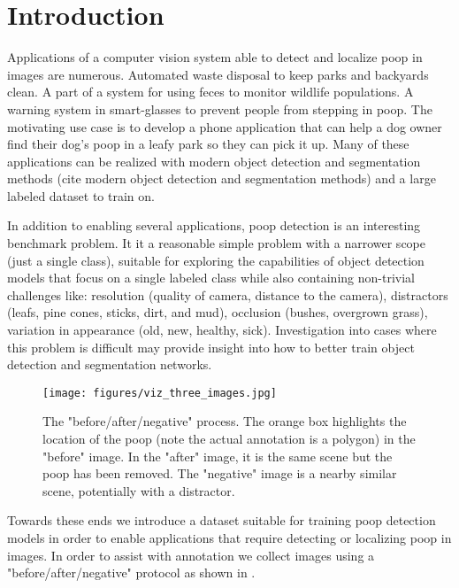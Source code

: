 \documentclass[10pt,twocolumn,letterpaper]{article}
\begin{document}
\section{Introduction}
\label{sec:intro}

Applications of a computer vision system able to detect and localize poop in
images are numerous.
Automated waste disposal to keep parks and backyards clean.
A part of a system for using feces to monitor wildlife populations.
A warning system in smart-glasses to prevent people from stepping in poop.
The motivating use case is to develop a phone application that can help a dog
owner find their dog's poop in a leafy park so they can pick it up.
Many of these applications can be realized with modern object detection and
segmentation methods (cite modern object detection and segmentation methods)
and a large labeled dataset to train on.


In addition to enabling several applications, poop detection is an interesting benchmark problem. 
It it a reasonable simple problem with a narrower scope (just a single class),
suitable for exploring the capabilities of object detection models that focus
on a single labeled class while also containing non-trivial challenges like:
resolution (quality of camera, distance to the camera),
distractors (leafs, pine cones, sticks, dirt, and mud),
occlusion (bushes, overgrown grass),
variation in appearance (old, new, healthy, sick).
Investigation into cases where this problem is difficult may provide insight
into how to better train object detection and segmentation networks.


\begin{figure}[ht]
\centering
\texttt{[image: figures/viz\_three\_images.jpg]}
\caption[]{
    The "before/after/negative" process.
    The orange box highlights the location of the poop (note the
    actual annotation is a polygon) in the "before" image.
    In the "after" image, it is the same scene but the poop has been removed.
    The "negative" image is a nearby similar scene, potentially with a distractor.
}
\label{fig:ThreeImages}
\end{figure}

Towards these ends we introduce a dataset suitable for training poop detection
models in order to enable applications that require detecting or localizing
poop in images. In order to assist with annotation we collect images using a
"before/after/negative" protocol as shown in . 
\end{document}
